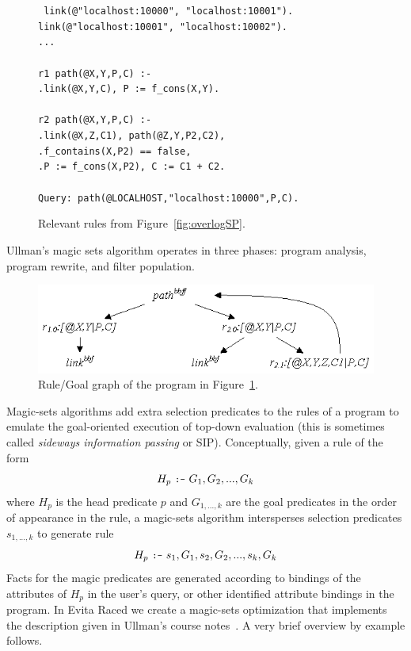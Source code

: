 \documentclass{sigmod08}
\newcommand{\datalogspace}{\textcolor[gray]{1}{.}\hspace{0.5in}}
\newcommand{\ol}[1]{\texttt{\small #1}\xspace}
\begin{document}
\begin{figure}[!t]
\centering
\begin{boxedminipage}{\linewidth}
\scriptsize{\tt
link(@"localhost:10000", "localhost:10001").\\
link(@"localhost:10001", "localhost:10002").\\
...\\
\\
r1 path(@X,Y,P,C) :- \\
\datalogspace link(@X,Y,C), P := f\_cons(X,Y). \\
\\
r2 path(@X,Y,P,C) :- \\
\datalogspace link(@X,Z,C1), path(@Z,Y,P2,C2),\\
\datalogspace f\_contains(X,P2) == false, \\
\datalogspace P := f\_cons(X,P2), C := C1 + C2. \\
\\
Query: path(@LOCALHOST,"localhost:10000",P,C).
}
\caption{\label{fig:querySP}Relevant rules from Figure~\ref{fig:overlogSP}.}
\end{boxedminipage}
\end{figure}

Ullman's magic sets algorithm operates in three phases: program analysis,
program rewrite, and filter population.
\begin{figure}[!t]
\begin{center}
\includegraphics{visio/RuleGoalGraph}
\caption{Rule/Goal graph of the program in Figure~\ref{fig:querySP}.}
\label{fig:rggraph}
\end{center}
\end{figure}


Magic-sets algorithms add extra selection predicates to the rules of a program to
emulate the goal-oriented execution of top-down evaluation (this is
sometimes called \emph{sideways information passing} or
SIP). Conceptually, given a rule of the form
\[
H_p \ \text{\ol{:-}}\  G_1, G_2, ..., G_k
\]
where $H_p$ is the head predicate $p$ and $G_{1,...,k}$ are the goal
predicates in the order of appearance in the rule, a magic-sets
algorithm intersperses selection predicates $s_{1,...,k}$ to generate rule
\[
H_p \ \text{\ol{:-}}\  s_1, G_1, s_2, G_2, ..., s_{k}, G_k
\]
Facts for the magic predicates are generated according to bindings of
the attributes of $H_p$ in the user's query, or other identified
attribute bindings in the program. In Evita Raced we create a magic-sets
optimization that implements the description given in Ullman's course notes~\cite{ullmanNotes}. 
A very brief overview by example follows.
\end{document}
